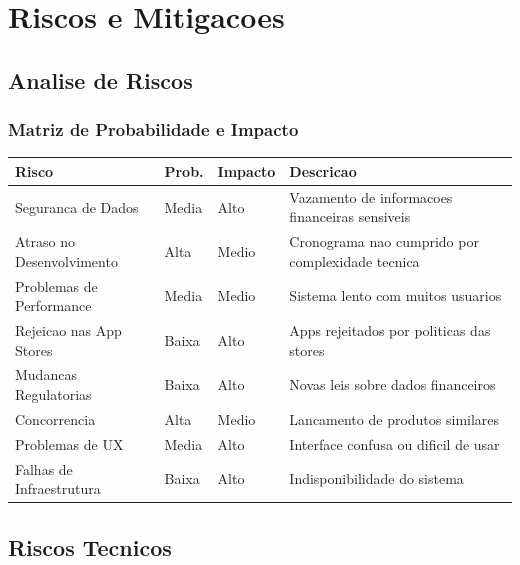 \section{Riscos e Mitigacoes}

\subsection{Analise de Riscos}

\subsubsection{Matriz de Probabilidade e Impacto}

\begin{longtable}{|p{4cm}|p{2cm}|p{2cm}|p{5cm}|}
\hline
\textbf{Risco} & \textbf{Prob.} & \textbf{Impacto} & \textbf{Descricao} \\
\hline
\endhead

Seguranca de Dados & Media & Alto & Vazamento de informacoes financeiras sensiveis \\
\hline

Atraso no Desenvolvimento & Alta & Medio & Cronograma nao cumprido por complexidade tecnica \\
\hline

Problemas de Performance & Media & Medio & Sistema lento com muitos usuarios \\
\hline

Rejeicao nas App Stores & Baixa & Alto & Apps rejeitados por politicas das stores \\
\hline

Mudancas Regulatorias & Baixa & Alto & Novas leis sobre dados financeiros \\
\hline

Concorrencia & Alta & Medio & Lancamento de produtos similares \\
\hline

Problemas de UX & Media & Alto & Interface confusa ou dificil de usar \\
\hline

Falhas de Infraestrutura & Baixa & Alto & Indisponibilidade do sistema \\
\hline

\end{longtable}

\subsection{Riscos Tecnicos}

